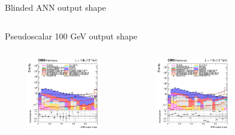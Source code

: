 \documentclass[8pt]{beamer}
\begin{document}
\begin{frame}{Blinded ANN output shape}
\begin{columns}
\begin{column}{1.09\textwidth}
\begin{block}{\centering Pseudoscalar 100 GeV output shape}\end{block}
\end{column}
\end{columns} \vspace{-5pt}

\begin{columns}
		\begin{column}{0.33\textwidth}
			\begin{center}
			\vspace{-8pt}
			\begin{block}{}\end{block}
     			\includegraphics[width=1.0\textwidth, height=90pt]{figs/2016/log_cratio_topCR_ll_var_DNN_signal0_pseudo100.png}
    		\end{center}		
		\end{column} 
		\begin{column}{0.33\textwidth}
			\begin{center}
			\vspace{-8pt}
			\begin{block}{}\end{block}
     			\includegraphics[width=1.0\textwidth, height=90pt]{figs/2017/log_cratio_topCR_ll_var_DNN_signal0_pseudo100.png}
    		\end{center}		
		\end{column} 
		\begin{column}{0.33\textwidth}
			\begin{center}
			\vspace{-8pt}

\end{center}
\end{column}
\end{columns}
\end{frame}
\end{document}
